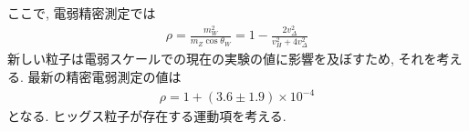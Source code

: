 ここで, 電弱精密測定では
\begin{align}
  \rho = \frac{m_W^2}{m_Z\cos\theta_W} = 1 - \frac{2v_\Delta^2}{v_H^2 + 4v_\Delta^2}
\end{align}
新しい粒子は電弱スケールでの現在の実験の値に影響を及ぼすため, それを考える.
最新の精密電弱測定の値は
\begin{align}
  \rho =1 + (3.6 ± 1.9)\times10^{-4}
\end{align}
となる.
ヒッグス粒子が存在する運動項を考える.

